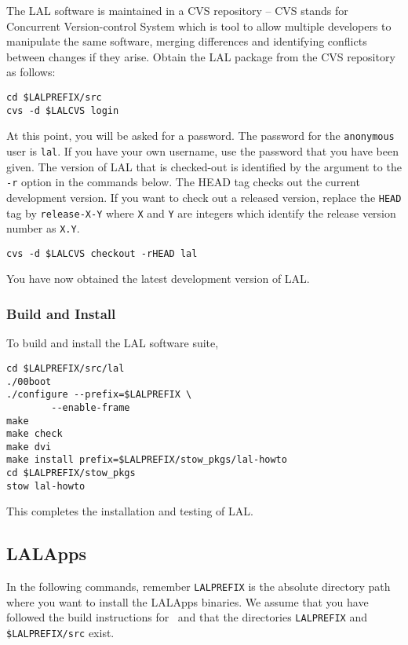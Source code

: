 The LAL software is maintained in a CVS repository -- CVS stands for
Concurrent Version-control System which is tool to allow multiple developers
to manipulate the same software,  merging differences and identifying
conflicts between changes if they arise.  Obtain the LAL package from the CVS
repository as follows:  
\begin{verbatim}
cd $LALPREFIX/src
cvs -d $LALCVS login
\end{verbatim}
At this point,  you will be asked for a password.  The password for the
\verb+anonymous+ user is \verb+lal+. If you have your own username, use the
password that you have been given.
The version of LAL that is checked-out is identified by the argument
to the \texttt{-r} option in the commands below.   The HEAD tag checks out the
current development version.  If you want to check out a released
version, replace the \verb+HEAD+ tag by \verb+release-X-Y+ where
\verb+X+ and \verb+Y+ are integers which identify the release version
number as \verb+X.Y+.
\begin{verbatim}
cvs -d $LALCVS checkout -rHEAD lal
\end{verbatim}
You have now obtained the latest development version of LAL.

\subsubsection{Build and Install}
To build and install the LAL software suite, 
\begin{verbatim}
cd $LALPREFIX/src/lal
./00boot
./configure --prefix=$LALPREFIX \
        --enable-frame
make
make check
make dvi
make install prefix=$LALPREFIX/stow_pkgs/lal-howto
cd $LALPREFIX/stow_pkgs
stow lal-howto
\end{verbatim}
This completes the installation and testing of LAL.  

\color{black}
\subsection{LALApps}
\color{black}

In the following commands, remember \verb+LALPREFIX+ is the absolute
directory path where you want to install the LALApps binaries.  We
assume that you have followed the build instructions for \lal\ and
that the directories \verb+LALPREFIX+ and \verb+$LALPREFIX/src+ exist.

